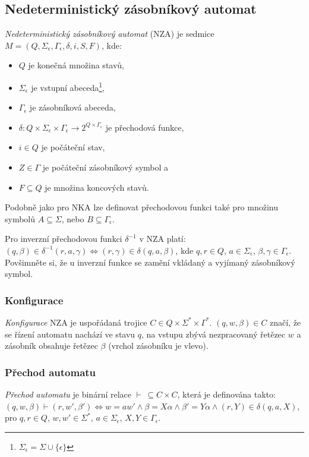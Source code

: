     \subsection{Nedeterministický zásobníkový automat}
        \textit{Nedeterministický zásobníkový automat} (NZA) je sedmice $M = (Q, \Sigma_\epsilon, \Gamma_\epsilon, \delta, i, S, F)$, kde:
        \begin{itemize}
            \item $Q$ je konečná množina stavů,
            \item $\Sigma_\epsilon$ je vstupní abeceda\footnote{$\Sigma_\epsilon = \Sigma \cup \{\epsilon\}$},
            \item $\Gamma_\epsilon$ je zásobníková abeceda,
            \item $\delta : Q \times \Sigma_\epsilon \times \Gamma_\epsilon \rightarrow 2^{Q \times \Gamma_\epsilon}$ je přechodová funkce,
            \item $i \in Q$ je počáteční stav,
            \item $Z \in \Gamma$ je počáteční zásobníkový symbol a
            \item $F \subseteq Q$ je množina koncových stavů.
        \end{itemize}

        Podobně jako pro NKA lze definovat přechodovou funkci také pro množinu symbolů $A \subseteq \Sigma$, nebo $B \subseteq \Gamma_\epsilon$.

        Pro inverzní přechodovou funkci $\delta^{-1}$ v NZA platí: $(q, \beta) \in \delta^{-1}(r, a, \gamma) \iff (r, \gamma) \in \delta(q, a, \beta)$, kde $q,r \in Q$, $a \in \Sigma_\epsilon$, $\beta, \gamma \in \Gamma_\epsilon$. Povšimněte si, že u inverzní funkce se zamění vkládaný a vyjímaný zásobníkový symbol.

        \subsubsection*{Konfigurace}
            \textit{Konfigurace} NZA je uspořádaná trojice $C \in Q \times \Sigma^* \times \Gamma^*$. $(q, w, \beta) \in C$ značí, že se řízení automatu nachází ve stavu $q$, na vstupu zbývá nezpracovaný řetězec $w$ a zásobník obsahuje řetězec $\beta$ (vrchol zásobníku je vlevo).

        \subsubsection*{Přechod automatu}
            \textit{Přechod automatu} je binární relace $\vdash\, \subseteq C \times C$, která je definována takto: $(q, w, \beta) \vdash (r, w', \beta') \iff w = aw' \land \beta = X\alpha \land \beta' = Y\alpha \land (r, Y) \in \delta(q, a, X)$, pro $q, r \in Q$, $w, w' \in \Sigma^*$, $a \in \Sigma_\epsilon$, $X, Y \in \Gamma_\epsilon$.

